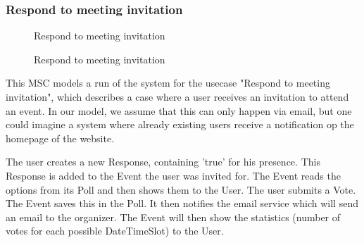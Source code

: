 	\subsubsection{Respond to meeting invitation}
		\begin{figure}[H]
			\centering
			\begin{msc}{Respond to meeting invitation}

				\nextlevel
				\nextlevel
				\nextlevel
				\nextlevel
				\nextlevel

				\nextlevel
				\nextlevel

				\nextlevel
				\nextlevel
				\nextlevel
				\nextlevel
				
				\nextlevel
			\end{msc}
			\caption{Respond to meeting invitation}
			\label{msc:respondinvite}
		\end{figure}

		This MSC models a run of the system for the usecase "Respond to meeting invitation", which describes a case where a user receives an invitation to attend an event. In our model, we assume that this can only happen via email, but one could imagine a system where already existing users receive a notification op the homepage of the website.

		The user creates a new Response, containing 'true' for his presence. This Response is added to the Event the user was invited for. The Event reads the options from its Poll and then shows them to the User. The user submits a Vote. The Event saves this in the Poll.
		It then notifies the email service which will send an email to the organizer.
		The Event will then show the statistics (number of votes for each possible DateTimeSlot) to the User.

